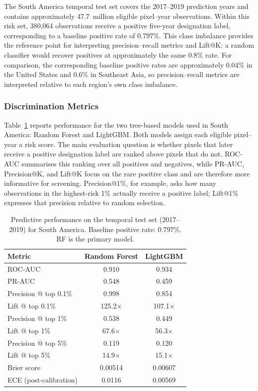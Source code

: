 \documentclass[12pt]{article}
\theoremstyle{break}
\begin{document}
The South America temporal test set covers the 2017--2019 prediction years and
contains approximately 47.7~million eligible pixel--year observations. Within this
risk set, 380,064 observations receive a positive five-year designation label,
corresponding to a baseline positive rate of 0.797\%. This class imbalance provides
the reference point for interpreting precision--recall metrics and Lift@K: a random
classifier would recover positives at approximately the same 0.8\% rate. For
comparison, the corresponding baseline positive rates are approximately 0.04\% in
the United States and 0.6\% in Southeast Asia, so precision--recall metrics are
interpreted relative to each region's own class imbalance.

\subsubsection{Discrimination Metrics}
\label{sec:results_sa_metrics}

Table~\ref{tab:sa_metrics} reports performance for the two tree-based models used
in South America: Random Forest and LightGBM. Both models assign each eligible
pixel--year a risk score. The main evaluation question is whether pixels that later
receive a positive designation label are ranked above pixels that do not. ROC-AUC
summarises this ranking over all positives and negatives, while PR-AUC, Precision@K,
and Lift@K focus on the rare positive class and are therefore more informative for
screening. Precision@1\%, for example, asks how many observations in the highest-risk
1\% actually receive a positive label; Lift@1\% expresses that precision relative to
random selection.

\begin{table}[H]
\centering
\caption{Predictive performance on the temporal test set (2017--2019) for South
America. Baseline positive rate: 0.797\%. RF is the primary model.}
\label{tab:sa_metrics}
\begin{tabular}{lcc}
\toprule
\textbf{Metric} & \textbf{Random Forest} & \textbf{LightGBM} \\
\midrule
ROC-AUC              & 0.910  & 0.934 \\
PR-AUC               & 0.548  & 0.459 \\
Precision @ top 0.1\% & 0.998 & 0.854 \\
Lift @ top 0.1\%      & 125.2$\times$ & 107.1$\times$ \\
Precision @ top 1\%   & 0.538  & 0.449 \\
Lift @ top 1\%        & 67.6$\times$ & 56.3$\times$ \\
Precision @ top 5\%  & 0.119  & 0.120 \\
Lift @ top 5\%       & 14.9$\times$ & 15.1$\times$ \\
Brier score          & 0.00514 & 0.00607 \\
ECE (post-calibration) & 0.0116 & 0.00569 \\
\bottomrule
\end{tabular}
\end{table}
\end{document}
